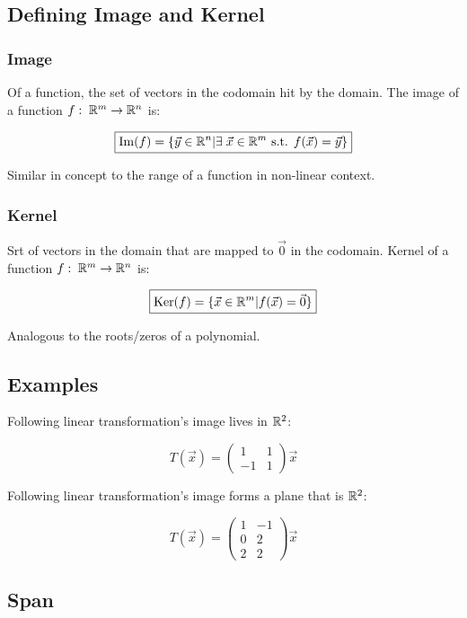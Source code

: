 \subsection{Defining Image and Kernel}

\subsubsection{Image}

Of a function, the set of vectors in the codomain hit by the domain.
The image of a function $f:\;\mathbb{R}^m\rightarrow \mathbb{R}^n$ is:

\[\boxed{
    \mathrm{Im}(f)=\{\vec{y}\in \mathbb{R}^n | \exists\;\vec{x}\in \mathbb{R}^m\text{ s.t. }f(\vec{x})=\vec{y}\}
}\]

Similar in concept to the range of a function in non-linear context.

\subsubsection{Kernel}

Srt of vectors in the domain that are mapped to $\vec{0}$ in the codomain.
Kernel of a function $f:\;\mathbb{R}^m\rightarrow \mathbb{R}^n$ is:

\[\boxed{
    \mathrm{Ker}(f)=\{\vec{x}\in \mathbb{R}^m | f(\vec{x})=\vec{0}\}
}\]

Analogous to the roots/zeros of a polynomial.

\subsection{Examples}

Following linear transformation's image lives in $\mathbb{R}^2$:

\[T(\vec{x})=\left(\begin{array}{cc}
    1 & 1 \\
    -1 & 1
    \end{array}\right) \vec{x}\]

Following linear transformation's image forms a plane that is
$\mathbb{R}^2$:

\[T(\vec{x})=\left(\begin{array}{cc}
    1 & -1 \\
    0 & 2 \\
    2 & 2
    \end{array}\right) \vec{x}\]

\subsection{Span}

